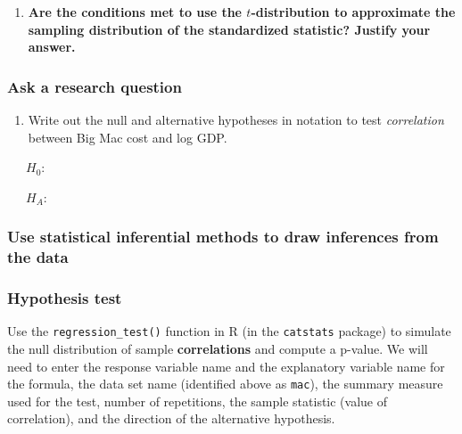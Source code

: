\documentclass[
]{report}
\providecommand{\tightlist}{%
  \setlength{\itemsep}{0pt}\setlength{\parskip}{0pt}}
\begin{document}
\begin{enumerate}
\def\labelenumi{\arabic{enumi}.}
\setcounter{enumi}{6}
\tightlist
\item
  \textbf{Are the conditions met to use the \(t\)-distribution to approximate the sampling distribution of the standardized statistic? Justify your answer.}
\end{enumerate}

\vspace{1.5in}

\newpage

\subsubsection*{Ask a research question}\label{ask-a-research-question-8}

\begin{enumerate}
\def\labelenumi{\arabic{enumi}.}
\setcounter{enumi}{7}
\tightlist
\item
  Write out the null and alternative hypotheses in notation to test \emph{correlation} between Big Mac cost and log GDP.
\end{enumerate}

\vspace{.2in}

~~~\(H_0:\)

\vspace{.2in}

~~~\(H_A:\)

\vspace{.2in}

\subsubsection*{Use statistical inferential methods to draw inferences from the data}\label{use-statistical-inferential-methods-to-draw-inferences-from-the-data-10}

\subsubsection*{Hypothesis test}\label{hypothesis-test-7}

Use the \texttt{regression\_test()} function in R (in the \texttt{catstats} package) to simulate the null distribution of sample \textbf{correlations} and compute a p-value. We will need to enter the response variable name and the explanatory variable name for the formula, the data set name (identified above as \texttt{mac}), the summary measure used for the test, number of repetitions, the sample statistic (value of correlation), and the direction of the alternative hypothesis.
\end{document}
